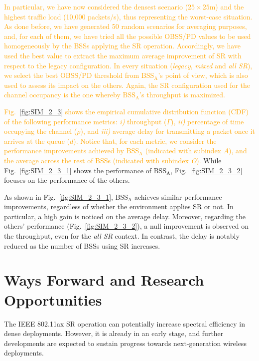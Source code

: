 \documentclass{ieeeaccess}
\begin{document}
\textcolor{orange}{In particular, we have now considered the densest scenario ($25\times25$m) and the highest traffic load (10,000 packets/s), thus representing the worst-case situation. As done before, we have generated 50 random scenarios for averaging purposes, and, for each of them, we have tried all the possible OBSS/PD values to be used homogeneously by the BSSs applying the SR operation. Accordingly, we have used the best value to extract the maximum average improvement of SR with respect to the legacy configuration. In every situation (\emph{legacy}, \emph{mixed} and \emph{all SR}), we select the best OBSS/PD threshold from $\text{BSS}_\text{A}$'s point of view, which is also used to assess its impact on the others. Again, the SR configuration used for the channel occupancy is the one whereby $\text{BSS}_\text{A}$'s throughput is maximized.}

\textcolor{orange}{Fig.~\ref{fig:SIM_2_3} shows the empirical cumulative distribution function (CDF) of the following performance metrics: \emph{i)} throughput ($\Gamma$), \emph{ii)} percentage of time occupying the channel ($\rho$), and \emph{iii)} average delay for transmitting a packet once it arrives at the queue ($d$). Notice that, for each metric, we consider the performance improvements achieved by $\text{BSS}_\text{A}$ (indicated with subindex \emph{A}), and the average across the rest of BSSs (indicated with subindex \emph{O}).} While Fig.~\ref{fig:SIM_2_3_1} shows the performance of BSS$_\text{A}$, Fig.~\ref{fig:SIM_2_3_2} focuses on the performance of the others.

As shown in Fig.~\ref{fig:SIM_2_3_1}, $\text{BSS}_\text{A}$ achieves similar performance improvements, regardless of whether the environment applies SR or not. In particular, a high gain is noticed on the average delay. Moreover, regarding the others' performance (Fig.~\ref{fig:SIM_2_3_2}), a null improvement is observed on the throughput, even for the \emph{all SR} context. In contrast, the delay is notably reduced as the number of BSSs using SR increases.

\section{Ways Forward and Research Opportunities}
\label{section:ways_forwad}
The IEEE 802.11ax SR operation can potentially increase spectral efficiency in dense deployments. However, it is already in an early stage, and further developments are expected to sustain progress towards next-generation wireless deployments. 
\end{document}
